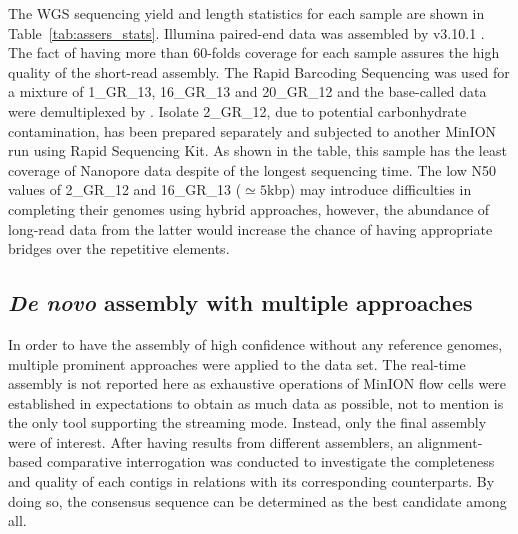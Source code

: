 The WGS sequencing yield and length statistics for each sample are shown in Table~\ref{tab:assers_stats}. 
Illumina paired-end data was assembled by \spades{} v3.10.1 \cite{BankevichNA2012}. The fact of having more than 60-folds coverage for each sample assures the high quality of the short-read assembly.
The Rapid Barcoding Sequencing was used for a mixture of 1\_GR\_13, 16\_GR\_13 and 20\_GR\_12 and the base-called data were demultiplexed by \npbarcode{}. Isolate 2\_GR\_12, due to potential carbonhydrate contamination, has been prepared separately and subjected to another MinION run using Rapid Sequencing Kit. As shown in the table, this sample has the least coverage of Nanopore data despite of the longest sequencing time. The low N50 values of 2\_GR\_12 and 16\_GR\_13 ($\simeq 5$kbp) may introduce difficulties in completing their genomes using hybrid approaches, however, the abundance of long-read data from the latter would increase the chance of having appropriate bridges over the repetitive elements.
\subsection{\emph{De novo} assembly with multiple approaches}
In order to have the assembly of high confidence without any reference genomes, multiple prominent approaches were applied to the data set. 
The real-time assembly is not reported here as exhaustive operations of MinION flow cells were established in expectations to obtain as much data as possible, not to mention \npscarf{} is the only tool supporting the streaming mode. Instead, only the final assembly were of interest. 
After having results from different assemblers, an alignment-based comparative interrogation was conducted to investigate the completeness and quality of each contigs in relations with its corresponding counterparts.
By doing so, the consensus sequence can be determined as the best candidate among all.

